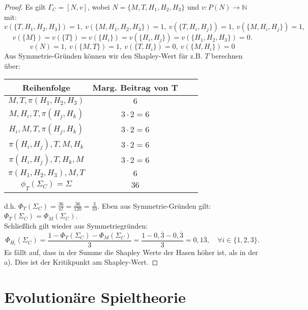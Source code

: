 \documentclass[12pt]{extreport} %
\newcommand{\N}{\mathbb{N}}
\theoremstyle{named}
\theoremstyle{itshape}
\theoremstyle{normal}
\begin{document}
\begin{enumerate}
 		\begin{proof}
 			Es gilt $\Gamma_C = [N, v]$, wobei $N = \{ M, T, H_{1}, H_{2}, H_{3} \}$ und $v \colon P(N) \rightarrow \N$ mit:
 			$$ v(\{T, H_{1}, H_{2}, H_{3} \}) = 1, ~ v(\{M, H_{1}, H_{2}, H_{3} \}) = 1,  ~ v(\{T, H_{i}, H_{j} \}) = 1, ~ v(\{M, H_{i}, H_{j} \}) = 1,$$
 			$$  v(\{M\}) = v(\{T\}) = v(\{ H_{i} \}) = v(\{ H_{i}, H_{j} \}) = v(\{ H_{1}, H_{2}, H_{3} \}) = 0. $$
 			$$ v(N) = 1, ~ v(\{M, T\}) = 1, ~v(\{T, H_{i}\}) = 0, ~ v(\{M, H_{i}\}) = 0$$
			Aus Symmetrie-Gründen können wir den Shapley-Wert für z.B. $T$ berechnen über:
  			\begin{center}
    			\begin{tabular}{| c | c | c | c |}
   					\hline
    					Reihenfolge & Marg. Beitrag von T \\ 
    						\hline
    					$M, T, \pi(H_{1}, H_{2}, H_{3})$ & $6$   \\ 
    						\hline
    					$M, H_{i}, T, \pi(H_{j}, H_{k})$ & $3 \cdot 2 = 6$  \\
    						\hline
    					$H_{i}, M, T, \pi(H_{j}, H_{k})$ & $3 \cdot 2 = 6$   \\
       						\hline
    					$\pi(H_{i}, H_{j}), T, M, H_{k}$ & $3 \cdot 2 = 6$   \\
      						\hline
    					$\pi(H_{i}, H_{j}), T, H_{k}, M$ & $3 \cdot 2 = 6$ \\
      						\hline
    					$\pi(H_{1}, H_{2}, H_{3}), M, T$  & $6$ \\
      						\hline \hline
    					$\phi_{T}(\Sigma_{C}) = \Sigma$  & $36$  \\
    				\hline
   				 \end{tabular}
    		\end{center}
    		d.h. $\Phi_{T}(\Sigma_{C}) = \frac{36}{n!} = \frac{36}{120} = \frac{3}{10}$. Eben aus Symmetrie-Gründen gilt: $\Phi_{T}(\Sigma_{C}) = \Phi_{M}(\Sigma_{C})$. \\ 
    		Schließlich gilt wieder aus Symmetriegründen:
    		$$ \Phi_{H_{i}}(\Sigma_{C}) = \frac{1 - \Phi_{T}(\Sigma_{C}) - \Phi_{M}(\Sigma_{C})}{3} = \frac{1 - 0,\overline{3} - 0,\overline{3}}{3} = 0,1\overline{3}, \quad \forall i \in \{1, 2, 3\}. $$
    		Es fällt auf, dass in der Summe die Shapley Werte der Hasen höher ist, als in der a). Dies ist der Kritikpunkt am Shapley-Wert.
 		\end{proof}
  \end{enumerate}

\chapter{Evolutionäre Spieltheorie}
\end{document}
